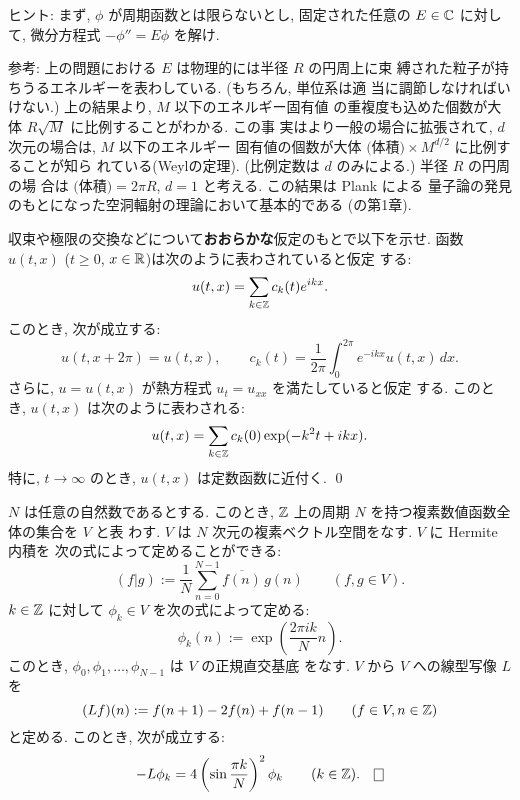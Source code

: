 \documentclass[12pt,twoside]{jarticle}
\def\Z{{\Bbb Z}} %
\def\R{{\Bbb R}} %
\def\C{{\Bbb C}} %
\begin{document}
\noindent ヒント: まず, $\phi$ が周期函数とは限らないとし, 
固定された任意の $E\in\C$ に対して, %
微分方程式 $- \phi'' = E \phi$ を解け. 

\noindent 参考: 上の問題における $E$ は物理的には半径 $R$ の円周上に束
縛された粒子が持ちうるエネルギーを表わしている. (もちろん, 単位系は適
当に調節しなければいけない.) 上の結果より, $M$ 以下のエネルギー固有値
の重複度も込めた個数が大体 $R\sqrt{M}$ に比例することがわかる. この事
実はより一般の場合に拡張されて, $d$ 次元の場合は, $M$ 以下のエネルギー
固有値の個数が大体 $\text{(体積)} \times M^{d/2}$ に比例することが知ら
れている(Weylの定理). (比例定数は $d$ のみによる.) 半径 $R$ の円周の場
合は $\text{(体積)} = 2\pi R$, $d=1$ と考える. この結果は Plank による
量子論の発見のもとになった空洞輻射の理論において基本的である
(\cite{Tomonaga}の第1章).

\begin{question}[円周上の熱方程式の解法]\label{q:heat2}
  収束や極限の交換などについて{\bf おおらかな}仮定のもとで以下を示せ. 
  函数 $u(t,x)$ ($t\ge 0$, $x \in\R$)は次のように表わされていると仮定
  する:
  \[
    u(t,x) = \sum_{k\in\Z} c_k(t) e^{ikx}.
  \]
  このとき, 次が成立する:
  \[
    u(t,x+2\pi) = u(t,x),
    \qquad
    c_k(t) = \frac{1}{2\pi} \int_0^{2\pi} e^{-ikx} u(t,x) \,dx.
  \]%
  さらに, $u = u(t,x)$ が熱方程式 $u_t = u_{xx}$ を満たしていると仮定
  する. このとき, $u(t,x)$ は次のように表わされる:
  \[
    u(t,x) = \sum_{k\in\Z} c_k(0) \exp(- k^2 t + ikx).
  \]
  特に, $t\to\infty$ のとき, $u(t,x)$ は定数函数に近付く. \qed
\end{question}

\begin{question}\label{q:disc-heat1}
  $N$ は任意の自然数であるとする. %
  このとき, $\Z$ 上の周期 $N$ を持つ複素数値函数全体の集合を $V$ と表
  わす. $V$ は $N$ 次元の複素ベクトル空間をなす. $V$ に Hermite 内積を
  次の式によって定めることができる:
  \[
    (f|g)
    := \frac{1}{N} \sum_{n=0}^{N-1} \overline{f(n)}\, g(n)
    \qquad
    (f, g \in V).
  \]
  $k \in \Z$ に対して $\phi_k\in V$ を次の式によって定める:
  \[
    \phi_k(n) := \exp\left( \frac{2\pi i k}{N} n \right).
  \]%
  このとき, $\phi_0, \phi_1, \dots, \phi_{N-1}$ は $V$ の正規直交基底
  をなす.  $V$ から $V$ への線型写像 $L$ を
  \[
    (Lf)(n) := f(n+1) - 2 f(n) + f(n-1)
    \qquad
    (f \in V, n \in \Z)
  \]
  と定める. このとき, 次が成立する:
  \[
    - L \phi_k = 4 \left( \sin \frac{\pi k}{N} \right)^2 \phi_k
    \qquad
    (k \in \Z).
  \qed
  \]
\end{question}
\end{document}
